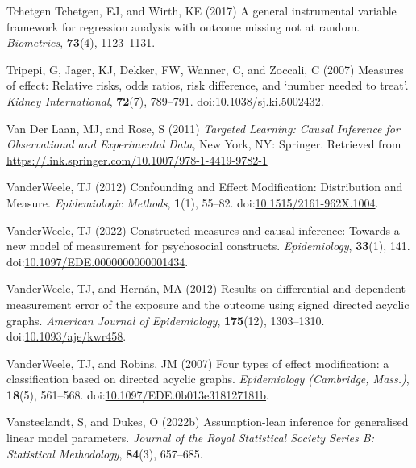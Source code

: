 \documentclass[
  single column]{article}
\newlength{\cslhangindent}
\newenvironment{CSLReferences}[2] %
 {\begin{list}{}{%
  \setlength{\itemindent}{0pt}
  \setlength{\leftmargin}{0pt}
  \setlength{\parsep}{0pt}
  \ifodd #1
   \setlength{\leftmargin}{\cslhangindent}
   \setlength{\itemindent}{-1\cslhangindent}
  \fi
  \setlength{\itemsep}{#2\baselineskip}}}
 {\end{list}}
\begin{document}
\begin{CSLReferences}{1}{0}
Tchetgen Tchetgen, EJ, and Wirth, KE (2017) A general instrumental
variable framework for regression analysis with outcome missing not at
random. \emph{Biometrics}, \textbf{73}(4), 1123--1131.

Tripepi, G, Jager, KJ, Dekker, FW, Wanner, C, and Zoccali, C (2007)
Measures of effect: Relative risks, odds ratios, risk difference, and
{`}number needed to treat{'}. \emph{Kidney International},
\textbf{72}(7), 789--791.
doi:\href{https://doi.org/10.1038/sj.ki.5002432}{10.1038/sj.ki.5002432}.

Van Der Laan, MJ, and Rose, S (2011) \emph{Targeted Learning: Causal
Inference for Observational and Experimental Data}, New York, NY:
Springer. Retrieved from
\url{https://link.springer.com/10.1007/978-1-4419-9782-1}

VanderWeele, TJ (2012) Confounding and Effect Modification: Distribution
and Measure. \emph{Epidemiologic Methods}, \textbf{1}(1), 55--82.
doi:\href{https://doi.org/10.1515/2161-962X.1004}{10.1515/2161-962X.1004}.

VanderWeele, TJ (2022) Constructed measures and causal inference:
Towards a new model of measurement for psychosocial constructs.
\emph{Epidemiology}, \textbf{33}(1), 141.
doi:\href{https://doi.org/10.1097/EDE.0000000000001434}{10.1097/EDE.0000000000001434}.

VanderWeele, TJ, and Hernán, MA (2012) Results on differential and
dependent measurement error of the exposure and the outcome using signed
directed acyclic graphs. \emph{American Journal of Epidemiology},
\textbf{175}(12), 1303--1310.
doi:\href{https://doi.org/10.1093/aje/kwr458}{10.1093/aje/kwr458}.

VanderWeele, TJ, and Robins, JM (2007) Four types of effect
modification: a classification based on directed acyclic graphs.
\emph{Epidemiology (Cambridge, Mass.)}, \textbf{18}(5), 561--568.
doi:\href{https://doi.org/10.1097/EDE.0b013e318127181b}{10.1097/EDE.0b013e318127181b}.

Vansteelandt, S, and Dukes, O (2022b) Assumption-lean inference for
generalised linear model parameters. \emph{Journal of the Royal
Statistical Society Series B: Statistical Methodology}, \textbf{84}(3),
657--685.


\end{CSLReferences}
\end{document}
